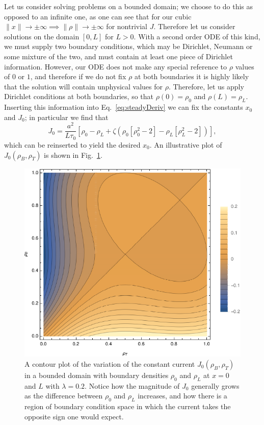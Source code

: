 Let us consider solving problems on a bounded domain; we choose to do this as opposed to an infinite one, as one can see that for our cubic $ \|x\|  \rightarrow \pm \infty \implies \|\rho\|  \rightarrow \pm \infty$ for nontrivial $J$.
Therefore let us consider solutions on the domain $[0, L]$ for $L>0$. With a second order ODE of this kind, we must supply two boundary conditions, which may be Dirichlet, Neumann or some mixture of the two,
and must contain at least one piece of Dirichlet information. However, our ODE does not make any special reference to $\rho$ values of $0$ or $1$, and therefore if we do not fix $\rho$ at both boundaries it is highly likely that the solution will contain
unphysical values for $\rho$. Therefore, let us apply Dirichlet conditions at both boundaries, so that $\rho(0) = \rho_0$ and $\rho(L) = \rho_L$. Inserting this information into Eq.~\ref{eq:steadyDeriv} we can fix the constants
$x_0$ and $J_0$; in particular we find that
\begin{equation}
  J_0 = \frac{a^2}{L \tau_0} \left[ \rho_0 - \rho_L + \zeta \left( \rho_0\left[\rho_0^2-2\right] - \rho_L\left[\rho_L^2-2\right] \right) \right],
\end{equation}
which can be reinserted to yield the desired $x_0$. An illustrative plot of $J_0(\rho_B, \rho_T)$ is shown in Fig.~\ref{fig:boundaryCurrent}.
\begin{figure}[h!]
 \caption{\label{fig:boundaryCurrent} A contour plot of the variation of the constant current $J_0(\rho_B, \rho_T)$ in a bounded domain with boundary densities $\rho_0$ and $\rho_L$ at $x=0$ and $L$  with $\lambda=0.2$.
 Notice how the magnitude of $J_0$ generally grows as the difference between $\rho_0$ and $\rho_L$ increases, and how there is a region of boundary condition space in which the current takes the opposite sign one would expect.}
 \includegraphics[width=0.99\linewidth]{analytics/images/boundaryCurrent}
\end{figure}


